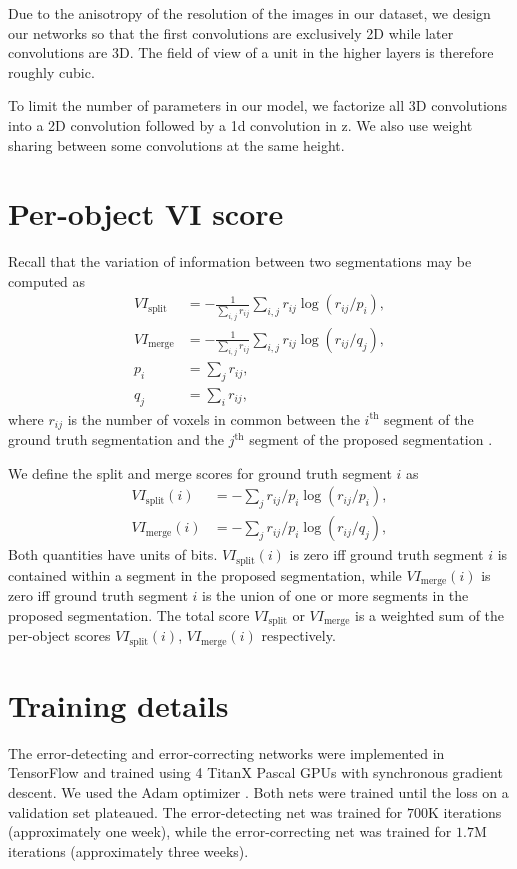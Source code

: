 \documentclass{article}
\begin{document}
\begin{appendices}
Due to the anisotropy of the resolution of the images in our dataset, we design our networks so that the first convolutions are exclusively 2D while later convolutions are 3D. The field of view of a unit in the higher layers is therefore roughly cubic.

To limit the number of parameters in our model, we factorize all 3D convolutions into a 2D convolution followed by a 1d convolution in z. We also use weight sharing between some convolutions at the same height.

\section{Per-object VI score}
\label{appendix:vi}
 Recall that the variation of information between two segmentations may be computed as
\begin{align*}
	VI_\text{split}&=-\frac 1 {\sum_{i,j} r_{ij}} \sum_{i,j} r_{ij} \log(r_{ij}/p_i),\\
	VI_\text{merge}&=-\frac 1 {\sum_{i,j} r_{ij}} \sum_{i,j} r_{ij} \log(r_{ij}/q_j),\\
	p_i&=\sum_j r_{ij},\\
	q_j&=\sum_i r_{ij},
\end{align*}
where $r_{ij}$ is the number of voxels in common between the $i^\text{th}$ segment of the ground truth segmentation and the $j^\text{th}$ segment of the proposed segmentation \cite{vi}.

We define the split and merge scores for ground truth segment $i$ as
\begin{align*}
	VI_\text{split}(i) &= -\sum_j r_{ij}/p_i \log(r_{ij}/p_i),\\
	VI_\text{merge}(i) &= -\sum_j r_{ij}/p_i \log(r_{ij}/q_j),
\end{align*}
Both quantities have units of bits. $VI_\text{split}(i)$ is zero iff ground truth segment $i$ is contained within a segment in the proposed segmentation, while $VI_\text{merge}(i)$ is zero iff ground truth segment $i$ is the union of one or more segments in the proposed segmentation. The total score $VI_\text{split}$ or $VI_\text{merge}$ is a weighted sum of the per-object scores $VI_\text{split}(i)$, $VI_\text{merge}(i)$ respectively.


\section{Training details}
The error-detecting and error-correcting networks were implemented in TensorFlow \cite{tensorflow} and trained using 4 TitanX Pascal GPUs with synchronous gradient descent. We used the Adam optimizer \cite{adam}.   Both nets were trained until the loss on a validation set plateaued. The error-detecting net was trained for $700$K iterations (approximately one week), while the error-correcting net was trained for $1.7$M iterations (approximately three weeks).

\end{appendices}


\end{document}
